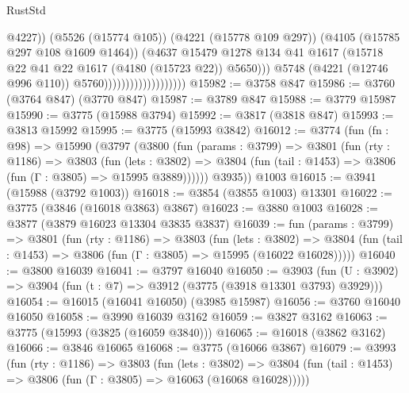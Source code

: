 \begin{lexlean}{RustStd}
\begin{coremodule}
                                                @4227))
                                            (@5526 (@15774 @105))
                                            (@4221 (@15778 @109 @297))
                                            (@4105 (@15785 @297 @108 @1609 @1464))
                                            (@4637
                                              @15479
                                              @1278
                                              @134
                                              @41
                                              @1617
                                              (@15718
                                                @22
                                                @41
                                                @22
                                                @1617
                                                (@4180 (@15723 @22))
                                                @5650)))
                                          @5748
                                          (@4221 (@12746 @996 @110))
                                          @5760)))))))))))))))))))
@15982 := @3758 @847
@15986 := @3760 (@3764 @847) (@3770 @847)
@15987 := @3789 @847
@15988 := @3779 @15987
@15990 := @3775 (@15988 @3794)
@15992 := @3817 (@3818 @847)
@15993 := @3813 @15992
@15995 := @3775 (@15993 @3842)
@16012 := @3774
    (fun (fn : @98) =>
    @15990
      (@3797
        (@3800
          (fun (params : @3799) =>
          @3801
            (fun (rty : @1186) =>
            @3803
              (fun (lets : @3802) =>
              @3804 (fun (tail : @1453) => @3806 (fun (Γ : @3805) => @15995 @3889))))))
        @3935))
    @1003
@16015 := @3941 (@15988 (@3792 @1003))
@16018 := @3854 (@3855 @1003) @13301
@16022 := @3775 (@3846 (@16018 @3863) @3867)
@16023 := @3880 @1003
@16028 := @3877 (@3879 @16023 @13304 @3835 @3837)
@16039 := fun (params : @3799) =>
  @3801
    (fun (rty : @1186) =>
    @3803
      (fun (lets : @3802) =>
      @3804 (fun (tail : @1453) => @3806 (fun (Γ : @3805) => @15995 (@16022 @16028)))))
@16040 := @3800 @16039
@16041 := @3797 @16040
@16050 := @3903
    (fun (U : @3902) => @3904 (fun (t : @7) => @3912 (@3775 (@3918 @13301 @3793) @3929)))
@16054 := @16015 (@16041 @16050) (@3985 @15987)
@16056 := @3760 @16040 @16050
@16058 := @3990 @16039 @3162
@16059 := @3827 @3162
@16063 := @3775 (@15993 (@3825 (@16059 @3840)))
@16065 := @16018 (@3862 @3162)
@16066 := @3846 @16065
@16068 := @3775 (@16066 @3867)
@16079 := @3993
    (fun (rty : @1186) =>
    @3803
      (fun (lets : @3802) =>
      @3804 (fun (tail : @1453) => @3806 (fun (Γ : @3805) => @16063 (@16068 @16028)))))

\end{coremodule}
\end{lexlean}

